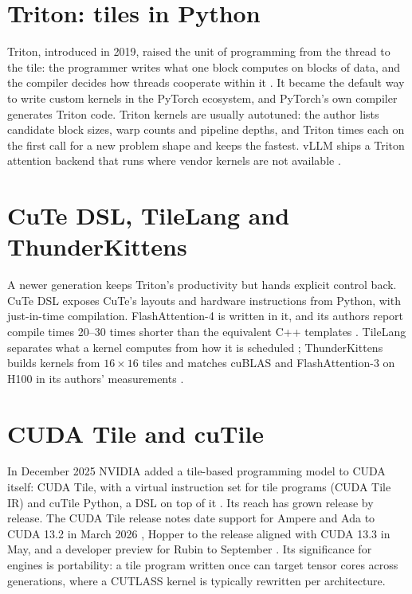 \section{Triton: tiles in Python}

Triton, introduced in 2019, raised the unit of programming from the thread to
the tile: the programmer writes what one block computes on blocks of data, and
the compiler decides how threads cooperate within it \cite{tillet2019triton}.
It became the default way to write custom kernels in the PyTorch ecosystem,
and PyTorch's own compiler generates Triton code. Triton kernels are usually
autotuned: the author lists candidate block sizes, warp counts and pipeline
depths, and Triton times each on the first call for a new problem shape and
keeps the fastest. vLLM ships a Triton attention backend that runs where vendor
kernels are not available \cite{vllm2026attentionbackends}.

\section{CuTe DSL, TileLang and ThunderKittens}

A newer generation keeps Triton's productivity but hands explicit control back.
CuTe DSL exposes CuTe's layouts and hardware instructions from Python, with
just-in-time compilation. FlashAttention-4 is written in it, and its authors
report compile times 20--30 times shorter than the equivalent C++ templates
\cite{zadouri2026flashattention4}. TileLang separates what a kernel computes
from how it is scheduled \cite{wang2025tilelang}; ThunderKittens builds kernels
from $16\times16$ tiles and matches cuBLAS and FlashAttention-3 on H100 in its
authors' measurements \cite{spector2024thunderkittens}.

\section{CUDA Tile and cuTile}

In December 2025 NVIDIA added a tile-based programming model to CUDA itself:
CUDA Tile, with a virtual instruction set for tile programs (CUDA Tile IR) and
cuTile Python, a DSL on top of it \cite{nvidia2025cuda131}. Its reach has grown
release by release. The CUDA Tile release notes date support for Ampere and
Ada to CUDA 13.2 in March 2026 \cite{bentz2026cuda132}, Hopper to the release
aligned with CUDA 13.3 in May, and a developer preview for Rubin to September
\cite{nvidia2026cudatile}. Its significance for engines is portability: a tile
program written once can target tensor cores across generations, where a
CUTLASS kernel is typically rewritten per architecture.

